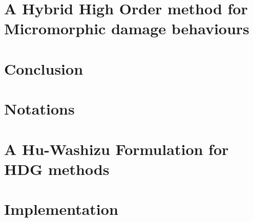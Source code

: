 \documentclass[a4paper, 11pt]{book}
\begin{document}
\chapter{A Hybrid High Order method for Micromorphic damage behaviours}







\chapter{Conclusion}



\appendix

\chapter{Notations}


\chapter{A Hu-Washizu Formulation for HDG methods}


\chapter{Implementation}





\end{document}
